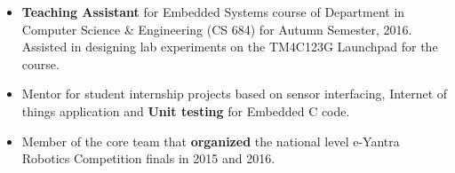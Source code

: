 \documentclass{article}
\begin{document}
\vspace{-2mm}\begin{itemize}[leftmargin=3.5mm]
	\setlength{\itemsep}{1mm}
	\item \textbf{Teaching Assistant} for Embedded Systems course of Department in Computer Science \& Engineering (CS 684) for Autumn Semester, 2016. Assisted in designing lab experiments on the TM4C123G Launchpad for the course.
		\vspace{-2mm}
	\item Mentor for student internship projects based on sensor interfacing, Internet of things application and \textbf{Unit testing} for Embedded C code.
		\vspace{-2mm}
	\item Member of the core team that \textbf{organized} the national level e-Yantra Robotics Competition finals in 2015 and 2016. 
\end{itemize}
\underline{}
\end{document}

